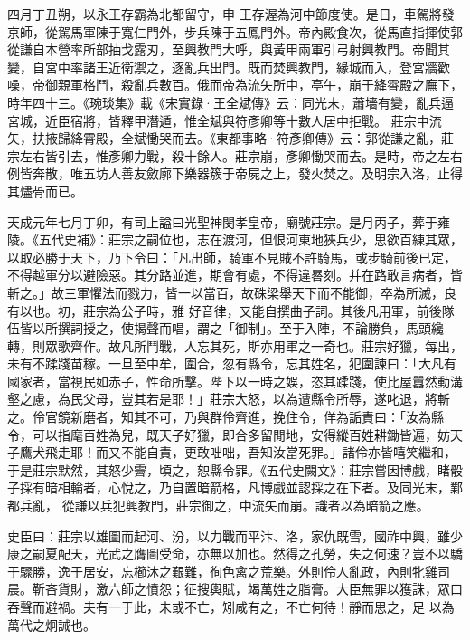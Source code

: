 \begin{pinyinscope}
 四月丁丑朔，以永王存霸為北都留守，申
 王存渥為河中節度使。是日，車駕將發京師，從駕馬軍陳于寬仁門外，步兵陳于五鳳門外。帝內殿食次，從馬直指揮使郭從謙自本營率所部抽戈露刃，至興教門大呼，與黃甲兩軍引弓射興教門。帝聞其變，自宮中率諸王近衛禦之，逐亂兵出門。既而焚興教門，緣城而入，登宮牆歡噪，帝御親軍格鬥，殺亂兵數百。俄而帝為流矢所中，亭午，崩于絳霄殿之廡下，時年四十三。《琬琰集》載《宋實錄·王全斌傳》云：同光末，蕭墻有變，亂兵逼宮城，近臣宿將，皆釋甲潛遁，惟全斌與符彥卿等十數人居中拒戰。
 莊宗中流矢，扶掖歸絳霄殿，全斌慟哭而去。《東都事略·符彥卿傳》云：郭從謙之亂，莊宗左右皆引去，惟彥卿力戰，殺十餘人。莊宗崩，彥卿慟哭而去。是時，帝之左右例皆奔散，唯五坊人善友斂廓下樂器簇于帝屍之上，發火焚之。及明宗入洛，止得其燼骨而已。



 天成元年七月丁卯，有司上謚曰光聖神閔孝皇帝，廟號莊宗。是月丙子，葬于雍陵。《五代史補》：莊宗之嗣位也，志在渡河，但恨河東地狹兵少，思欲百練其眾，以取必勝于天下，乃下令曰：「凡出師，騎軍不見賊不許騎馬，或步騎前後已定，不得越軍分以避險惡。其分路並進，期會有處，不得違晷刻。并在路敢言病者，皆斬之。」故三軍懼法而戮力，皆一以當百，故硃梁舉天下而不能御，卒為所滅，良有以也。初，莊宗為公子時，雅
 好音律，又能自撰曲子詞。其後凡用軍，前後隊伍皆以所撰詞授之，使揭聲而唱，謂之「御制」。至于入陣，不論勝負，馬頭纔轉，則眾歌齊作。故凡所鬥戰，人忘其死，斯亦用軍之一奇也。莊宗好獵，每出，未有不蹂踐苗稼。一旦至中牟，圍合，忽有縣令，忘其姓名，犯圍諫曰：「大凡有國家者，當視民如赤子，性命所擊。陛下以一時之娛，恣其蹂踐，使比屋囂然動溝壑之慮，為民父母，豈其若是耶！」莊宗大怒，以為遭縣令所辱，遂叱退，將斬之。伶官鏡新磨者，知其不可，乃與群伶齊進，挽住令，佯為詬責曰：「汝為縣令，可以指麾百姓為兒，既天子好獵，即合多留閒地，安得縱百姓耕鋤皆遍，妨天子鷹犬飛走耶！而又不能自責，更敢咄咄，吾知汝當死罪。」諸伶亦皆嘻笑繼和，于是莊宗默然，其怒少霽，頃之，恕縣令罪。《五代史闕文》：莊宗嘗因博戲，睹骰子採有暗相輪者，心悅之，乃自置暗箭格，凡博戲並認採之在下者。及同光末，鄴都兵亂，
 從謙以兵犯興教門，莊宗御之，中流矢而崩。識者以為暗箭之應。



 史臣曰：莊宗以雄圖而起河、汾，以力戰而平汴、洛，家仇既雪，國祚中興，雖少康之嗣夏配天，光武之膺圖受命，亦無以加也。然得之孔勞，失之何速？豈不以驕于驟勝，逸于居安，忘櫛沐之艱難，徇色禽之荒樂。外則伶人亂政，內則牝雞司晨。靳吝貨財，激六師之憤怨；征搜輿賦，竭萬姓之脂膏。大臣無罪以獲誅，眾口吞聲而避禍。夫有一于此，未或不亡，矧咸有之，不亡何待！靜而思之，足
 以為萬代之炯誡也。



\end{pinyinscope}
